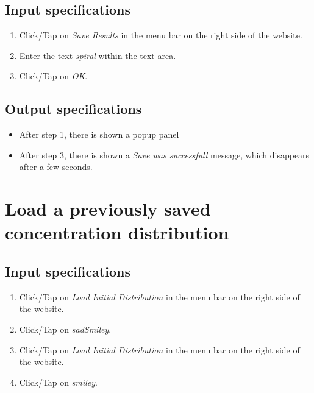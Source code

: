 \subsection*{Input specifications}
\begin{enumerate}
\item Click/Tap on \emph{Save Results} in the menu bar on the right side of the website.
\item Enter the text \emph{spiral} within the text area.
\item Click/Tap on \emph{OK}.
\end{enumerate}

\subsection*{Output specifications}
\begin{itemize}
\item After step 1, there is shown a popup panel
\item After step 3, there is shown a \emph{Save was successfull} message, which disappears after a few seconds.
\end{itemize}

\section{Load a previously saved concentration distribution}

\subsection*{Input specifications}
\begin{enumerate}
\item Click/Tap on \emph{Load Initial Distribution} in the menu bar on the right side of the website.
\item Click/Tap on \emph{sadSmiley}.
\item Click/Tap on \emph{Load Initial Distribution} in the menu bar on the right side of the website.
\item Click/Tap on \emph{smiley}.
\end{enumerate}

